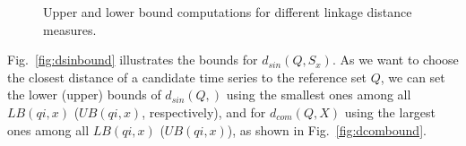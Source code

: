 \begin{figure}[tbp]
\hspace{0.1cm}
\vspace{-0.1in}
\caption{Upper and lower bound computations for different linkage distance measures.}
\label{fig:newbounds}
\vspace{-0.15in}
\end{figure}

Fig.~\ref{fig:dsinbound} illustrates the bounds for $d_{sin}(Q,S_x)$.
As we want to choose the closest distance of
a candidate time series to the reference set $Q$, we can set the lower
(upper) bounds of $d_{sin}(Q,)$ using the smallest ones among all
$LB(qi,x)$ ($UB(qi,x)$, respectively), and for $d_{com}(Q,X)$ using
the largest ones among all $LB(qi,x)$ ($UB(qi,x)$), as shown in
Fig.~\ref{fig:dcombound}.

